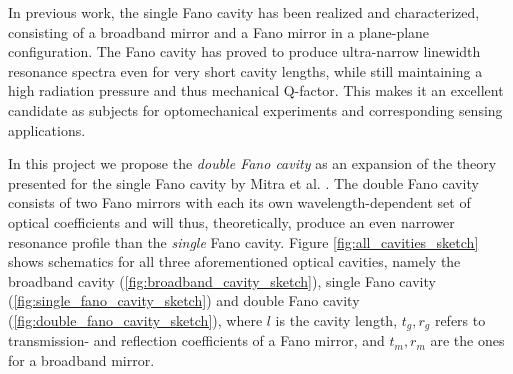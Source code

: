 In previous work, the single Fano cavity has been realized and characterized, consisting of a broadband mirror and a Fano mirror in a plane-plane configuration. The Fano cavity has proved to produce ultra-narrow linewidth resonance spectra even for very short cavity lengths, while still maintaining a high radiation pressure and thus mechanical Q-factor. This makes it an excellent candidate as subjects for optomechanical experiments and corresponding sensing applications. 

In this project we propose the \emph{double Fano cavity} as an expansion of the theory presented for the single Fano cavity by Mitra et al. \cite{Mitra}. The double Fano cavity consists of two Fano mirrors with each its own wavelength-dependent set of optical coefficients and will thus, theoretically, produce an even narrower resonance profile than the \emph{single} Fano cavity. Figure \ref{fig:all_cavities_sketch} shows schematics for all three aforementioned optical cavities, namely the broadband cavity (\ref{fig:broadband_cavity_sketch}), single Fano cavity (\ref{fig:single_fano_cavity_sketch}) and double Fano cavity (\ref{fig:double_fano_cavity_sketch}), where $l$ is the cavity length, $t_g, r_g$ refers to transmission- and reflection coefficients of a Fano mirror, and $t_m, r_m$ are the ones for a broadband mirror.

